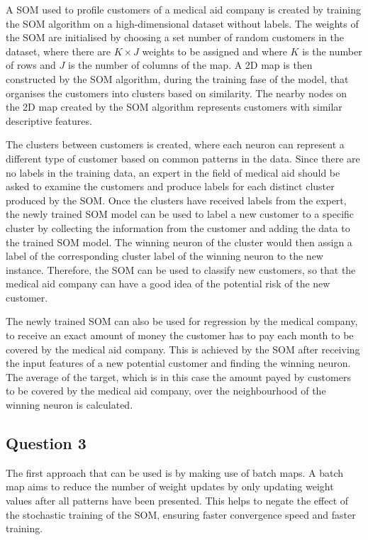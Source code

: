 \documentclass[10pt]{article}
\begin{document}
A SOM used to profile customers of a medical aid company is created by training the SOM algorithm on
a high-dimensional dataset without labels. The weights of the SOM are initialised by choosing a set number
of random customers in the dataset, where there are $K \times J$ weights to be assigned and where $K$ is the number
of rows and $J$ is the number of columns of the map. A 2D map is then constructed by the SOM algorithm, during
the training fase of the model, that organises the customers into clusters based on similarity. The nearby
nodes on the 2D map created by the SOM algorithm represents customers with similar descriptive features.

The clusters between customers is created, where each neuron can represent a different type of customer
based on common patterns in the data. Since there are no labels in the training data, an expert in the
field of medical aid should be asked to examine the customers and produce labels for each distinct cluster
produced by the SOM. Once the clusters have received labels from the expert, the newly trained SOM model can be used
to label a new customer to a specific cluster by collecting the information from the customer
and adding the data to the trained SOM model. The winning neuron of the cluster would then assign a label of the
corresponding cluster label of the winning neuron to the new instance. Therefore, the SOM can be used
to classify new customers, so that the medical aid company can have a good idea of the potential risk
of the new customer.

The newly trained SOM can also be used for regression by the medical company, to receive an exact
amount of money the customer has to pay each month to be covered by the medical aid company. This
is achieved by the SOM after receiving the input features of a new potential customer and finding the
winning neuron. The average of the target, which is in this case the amount payed by customers to be
covered by the medical aid company, over the neighbourhood of the winning neuron is calculated.

\subsection*{Question 3}

The first approach that can be used is by making use of batch maps. A batch map aims to reduce
the number of weight updates by only updating weight values after all patterns have been presented.
This helps to negate the effect of the stochastic training of the SOM, ensuring faster convergence
speed and faster training.
\end{document}
